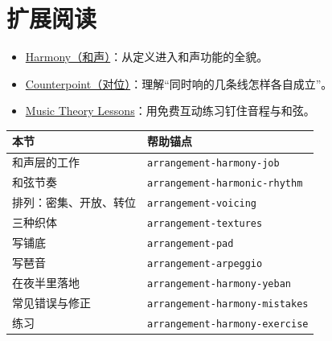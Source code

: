 \section{扩展阅读}
\label{sec:04-harmony-further-reading}
\begin{itemize}
  \item \href{https://en.wikipedia.org/wiki/Harmony}{Harmony（和声）}：从定义进入和声功能的全貌。
  \item \href{https://en.wikipedia.org/wiki/Counterpoint}{Counterpoint（对位）}：理解“同时响的几条线怎样各自成立”。
  \item \href{https://www.musictheory.net/lessons}{Music Theory Lessons}：用免费互动练习钉住音程与和弦。
\end{itemize}

\begin{helpmapping}
\begin{longtable}{p{}p{}}
\toprule
本节 & 帮助锚点 \\
\midrule
和声层的工作 & \texttt{arrangement-harmony-job} \\
和弦节奏 & \texttt{arrangement-harmonic-rhythm} \\
排列：密集、开放、转位 & \texttt{arrangement-voicing} \\
三种织体 & \texttt{arrangement-textures} \\
写铺底 & \texttt{arrangement-pad} \\
写琶音 & \texttt{arrangement-arpeggio} \\
在夜半里落地 & \texttt{arrangement-harmony-yeban} \\
常见错误与修正 & \texttt{arrangement-harmony-mistakes} \\
练习 & \texttt{arrangement-harmony-exercise} \\
\bottomrule
\end{longtable}
\end{helpmapping}

